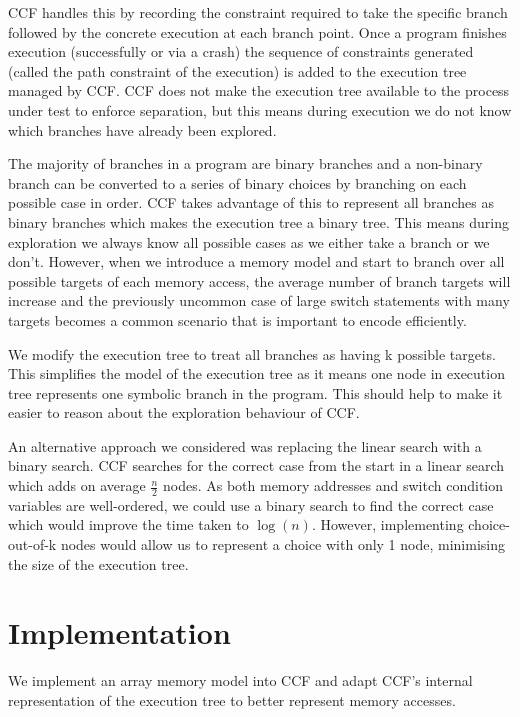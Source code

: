\documentclass[12pt,twoside]{report}
\begin{document}
CCF handles this by recording the constraint required to take the specific branch followed by the concrete execution at each branch point. Once a program finishes execution (successfully or via a crash) the sequence of constraints generated (called the path constraint of the execution) is added to the execution tree managed by CCF. CCF does not make the execution tree available to the process under test to enforce separation, but this means during execution we do not know which branches have already been explored.

The majority of branches in a program are binary branches and a non-binary branch can be converted to a series of binary choices by branching on each possible case in order. CCF takes advantage of this to represent all branches as binary branches which makes the execution tree a binary tree. This means during exploration we always know all possible cases as we either take a branch or we don't. However, when we introduce a memory model and start to branch over all possible targets of each memory access, the average number of branch targets will increase and the previously uncommon case of large switch statements with many targets becomes a common scenario that is important to encode efficiently.

We modify the execution tree to treat all branches as having k possible targets. This simplifies the model of the execution tree as it means one node in execution tree represents one symbolic branch in the program. This should help to make it easier to reason about the exploration behaviour of CCF.

An alternative approach we considered was replacing the linear search with a binary search. CCF searches for the correct case from the start in a linear search which adds on average $\frac{n}{2}$ nodes. As both memory addresses and switch condition variables are well-ordered, we could use a binary search to find the correct case which would improve the time taken to $\log(n)$. However, implementing choice-out-of-k nodes would allow us to represent a choice with only 1 node, minimising the size of the execution tree.






\chapter{Implementation}
We implement an array memory model into CCF and adapt CCF's internal representation of the execution tree to better represent memory accesses.
\end{document}
